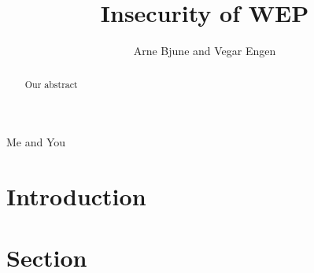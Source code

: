 \documentclass[twocolumn]{IEEEtran}
\begin{document}
\title{Insecurity of WEP}


\author{Arne Bjune and Vegar Engen}

{Me and You}

\maketitle

\begin{abstract}
Our abstract
\end{abstract}

\section {Introduction}


\section {Section}



\end{document}
